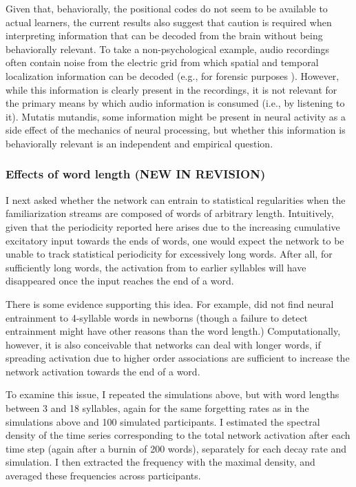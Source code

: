 \documentclass[
]{article}
\begin{document}
Given that, behaviorally, the positional codes do not seem to be
available to actual learners, the current results also suggest that
caution is required when interpreting information that can be decoded
from the brain without being behaviorally relevant. To take a
non-psychological example, audio recordings often contain noise from the
electric grid from which spatial and temporal localization information
can be decoded (e.g., for forensic purposes \citep{Grigoras2005}).
However, while this information is clearly present in the recordings, it
is not relevant for the primary means by which audio information is
consumed (i.e., by listening to it). Mutatis mutandis, some information
might be present in neural activity as a side effect of the mechanics of
neural processing, but whether this information is behaviorally relevant
is an independent and empirical question.

\hypertarget{effects-of-word-length-new-in-revision}{%
\subsubsection{Effects of word length (NEW IN
REVISION)}\label{effects-of-word-length-new-in-revision}}

I next asked whether the network can entrain to statistical regularities
when the familiarization streams are composed of words of arbitrary
length. Intuitively, given that the periodicity reported here arises due
to the increasing cumulative excitatory input towards the ends of words,
one would expect the network to be unable to track statistical
periodicity for excessively long words. After all, for sufficiently long
words, the activation from to earlier syllables will have disappeared
once the input reaches the end of a word.

There is some evidence supporting this idea. For example,
\citep{Benjamin2023} did not find neural entrainment to 4-syllable words
in newborns (though a failure to detect entrainment might have other
reasons than the word length.) Computationally, however, it is also
conceivable that networks can deal with longer words, if spreading
activation due to higher order associations are sufficient to increase
the network activation towards the end of a word.

To examine this issue, I repeated the simulations above, but with word
lengths between 3 and 18 syllables, again for the same forgetting rates
as in the simulations above and 100 simulated participants. I estimated
the spectral density of the time series corresponding to the total
network activation after each time step (again after a burnin of 200
words), separately for each decay rate and simulation. I then extracted
the frequency with the maximal density, and averaged these frequencies
across participants.
\end{document}
